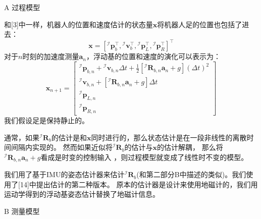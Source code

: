 A 过程模型

和[3]中一样，机器人的位置和速度估计的状态量$\boldsymbol{x}$将机器人足的位置也包括了进去：
\begin{equation}
    \label{equ:est_posvel}
    \boldsymbol{x}=\left[{ }^\mathcal{I} \boldsymbol{p}_b^{\top},{ }^\mathcal{I} \boldsymbol{v}_b^{\top},{ }^\mathcal{I} \boldsymbol{p}_L^{\top},{ }^\mathcal{I} \boldsymbol{p}_R^{\top}\right]^{\top}
\end{equation}
对于$n$时刻的加速度测量$\boldsymbol{a}_n$，浮动基的位置和速度的演化可以表示为：
\begin{equation}
    \label{equ:est_posvel}
    \boldsymbol{x}_{n+1}=\left[\begin{array}{c}
        { }^{\mathcal{I}} \boldsymbol{p}_{b, n}+{ }^{\mathcal{I}} \boldsymbol{v}_{b, n} \Delta t+\frac{1}{2}\left[{ }^{\mathcal{I}} \boldsymbol{R}_{b, n} \boldsymbol{a}_n+g\right](\Delta t)^2 \\
        { }^{\mathcal{I}} \boldsymbol{v}_{b, n}+\left[{ }^{\mathcal{I}} \boldsymbol{R}_{b, n} \boldsymbol{a}_n+g\right] \Delta t \\
        { }^{\mathcal{I}} \boldsymbol{p}_{L, n} \\
        { }^{\mathcal{I}} \boldsymbol{p}_{R, n}
        \end{array}\right]
\end{equation}
我们假设足是保持静止的。

通常，如果${ }^{\mathcal{I}} \boldsymbol{R}_{b}$的估计是和$\boldsymbol{x}$同时进行的，那么状态估计是在一段非线性的离散时间间隔内实现的。
然而如果近似将${ }^{\mathcal{I}} \boldsymbol{R}_{b}$的估计与$\boldsymbol{x}$的估计解耦，
那么将${ }^{\mathcal{I}} \boldsymbol{R}_{b, n} \boldsymbol{a}_n+g$看成是时变的控制输入 ，则过程模型就变成了线性时不变的模型。

我们用了基于IMU的姿态估计器来估计${ }^{\mathcal{I}} \boldsymbol{R}_{b}$(和第二部分B中描述的类似)。我们使用了[14]中提出估计的第二种版本。
原本的估计器是设计来使用地磁计的，我们用运动学得到的浮动基姿态估计替换了地磁计信息。

B 测量模型


